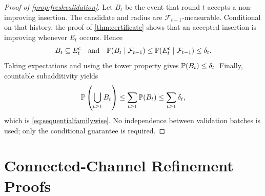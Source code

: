 \begin{proof}[Proof of \cref{prop:freshvalidation}]
Let $B_t$ be the event that round $t$ accepts a non-improving insertion.  The
candidate and radius are $\mathcal F_{t-1}$-measurable.  Conditional on that
history, the proof of \cref{thm:certificate} shows that an accepted insertion
is improving whenever $E_t$ occurs.  Hence
\begin{equation}
 B_t\subseteq E_t^c
 \quad\text{and}\quad
 \mathbb{P}(B_t\mid\mathcal F_{t-1})
 \le\mathbb{P}(E_t^c\mid\mathcal F_{t-1})\le\delta_t.
\end{equation}
Taking expectations and using the tower property gives
$\mathbb{P}(B_t)\le\delta_t$.  Finally, countable subadditivity yields
\begin{equation}
 \mathbb{P}\left(\bigcup_{t\ge1}B_t\right)
 \le\sum_{t\ge1}\mathbb{P}(B_t)
 \le\sum_{t\ge1}\delta_t,
\end{equation}
which is \cref{eq:sequentialfamilywise}.  No independence between validation
batches is used; only the conditional guarantee is required.
\end{proof}



\section{Connected-Channel Refinement Proofs}
\label{app:channelproofs}


